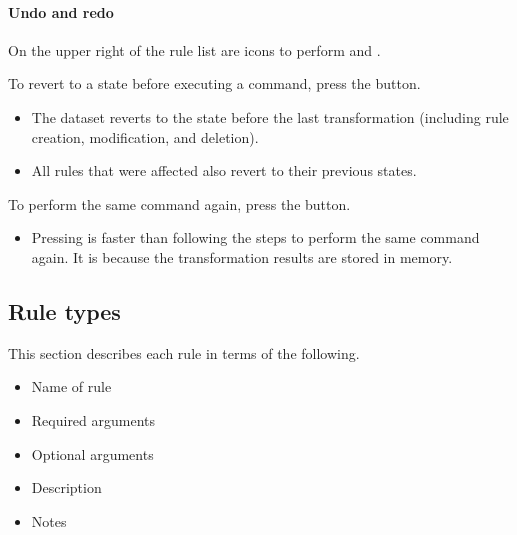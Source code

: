 \documentclass[letterpaper,10pt,english]{sphinxmanual}
\begin{document}
\paragraph{Undo and redo}
\label{\detokenize{discovery/part07/edit_rules:undo-redo}}
On the upper right of the rule list are icons to perform  and .
\begin{quote}

\begin{figure}[H]
\centering

\noindent{}
\end{figure}
\end{quote}

To revert to a state before executing a command, press the  button.
\begin{itemize}
\item {} 
The dataset reverts to the state before the last transformation (including rule creation, modification, and deletion).

\item {} 
All rules that were affected also revert to their previous states.

\end{itemize}

To perform the same command again, press the  button.
\begin{itemize}
\item {} 
Pressing  is faster than following the steps to perform the same command again. It is because the transformation results are stored in memory.

\end{itemize}


\subsection{Rule types}
\label{\detokenize{discovery/part07/rule_kinds:id1}}\label{\detokenize{discovery/part07/rule_kinds::doc}}
This section describes each rule in terms of the following.
\begin{itemize}
\item {} 
Name of rule

\item {} 
Required arguments

\item {} 
Optional arguments

\item {} 
Description

\item {} 
Notes

\end{itemize}
\end{document}
